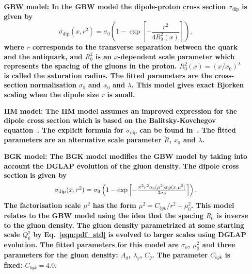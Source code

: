 \begin{description}
\item \bf {GBW model:} \rm
In the GBW model the dipole-proton cross section $\sigma_{\text{dip}}$ is given by
\begin{equation}
\label{eGBW}
   \sigma_{\text{dip}}(x,r^{2}) = \sigma_{0} \left(1 - \exp \left[-\frac{r^{2}}{4R_{0}^{2}(x)} \right]\right),
\end{equation}
where $r$ corresponds to the transverse separation between the quark and the antiquark, and $R_{0}^{2}$
 is 
an $x$-dependent scale parameter which represents the spacing of the gluons in the proton. $R_{0}^{2}(x)=\left(x/x_{0}\right)^{\lambda}$ is called the saturation radius.
The fitted parameters are the cross-section normalisation $\sigma_{0}$ and $x_{0}$ and $\lambda$. This model gives exact Bjorken scaling when the dipole size $r$ is small.

\vspace{0.1cm}
\item \bf {IIM model:} \rm
The IIM model assumes an improved expression for the dipole cross section which is based on the 
Balitsky-Kovchegov equation~\cite{Balitsky:1995ub}. The explicit formula for $\sigma_{\text{dip}}$ 
can be found in~\cite{Iancu:2003ge}. The fitted parameters are an alternative scale parameter $\tilde{R}$, $x_{0}$ and $\lambda$.

\vspace{0.1cm}
\item \bf {BGK model:} \rm
The BGK model modifies the GBW model by taking into account the  DGLAP evolution
of the gluon density. 
The dipole cross section is given by
\begin{equation}
\begin{array}{lcl}
   \sigma_{\text{dip}}(x,r^{2})  =  \sigma_{0} 
\left(1 - \exp \left[-\frac{\pi^{2} r^{2} \alpha_\mathrm{s} (\mu^{2}) xg(x,\mu^{2})}{3 \sigma_{0}} \right]\right).
\end{array}
\label{eBGK}
\end{equation}
The factorisation scale $\mu^{2}$ has the form $\mu^{2} = C_{bgk}/r^{2}+\mu^{2}_{0}$.
This model relates to the GBW model using the idea that the spacing $R_0$ is inverse to the gluon density.
The gluon density parametrized at some starting scale $Q_{0}^{2}$ by Eq.~\ref{eqn:pdf_std}
is evolved to larger scales using DGLAP evolution.
The fitted parameters for this model are $\sigma_{0}$, $\mu^{2}_{0}$ and three parameters for the gluon density: $A_{g}$, $\lambda_{g}$, $C_{g}$. The parameter $C_{bgk}$ is fixed: $C_{bgk} = 4.0$. 


\end{description}
